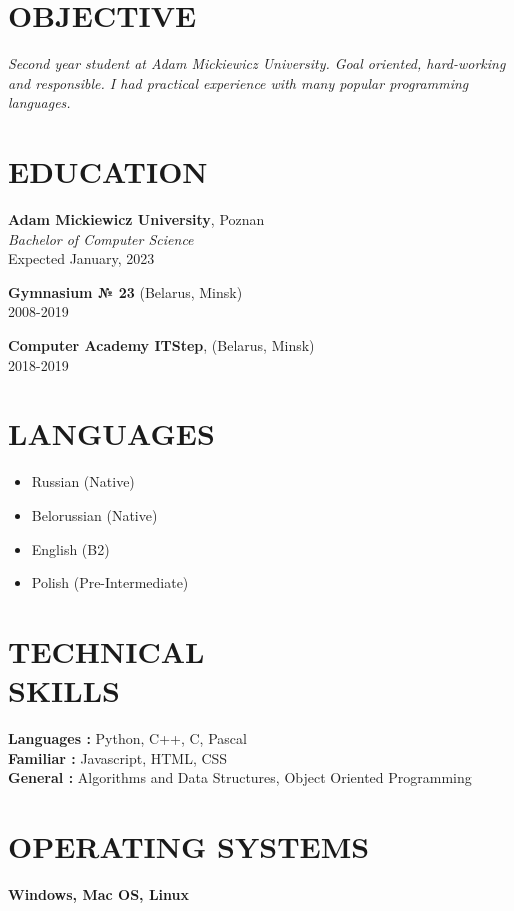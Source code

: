 \documentclass[margin]{res}
\begin{document}
\begin{resume}

\section{OBJECTIVE}
{\sl Second year  student at Adam Mickiewicz University. Goal oriented, hard-working and responsible. I had practical experience with many popular programming languages. }


\section{EDUCATION}
\textbf{Adam Mickiewicz University}, Poznan\\
{\sl Bachelor of Computer Science }\\
Expected January, 2023

\textbf{Gymnasium № 23} (Belarus, Minsk) \\
2008-2019

\textbf{Computer Academy ITStep}, (Belarus, Minsk) \\
2018-2019

\section{LANGUAGES}

\begin{itemize}
    \item Russian (Native)
    \item Belorussian (Native)
    \item English (B2)
    \item Polish (Pre-Intermediate)
\end{itemize}

\section{TECHNICAL\\SKILLS}

\textbf{Languages : } Python, C++, C, Pascal
\\
\textbf{Familiar : } Javascript, HTML, CSS
\\
\textbf{General : } Algorithms and Data Structures, Object Oriented Programming


\section{OPERATING SYSTEMS}
\textbf{Windows, Mac OS, Linux  \\}


\end{resume}
\end{document}
